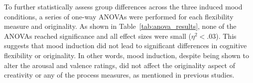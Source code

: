 \documentclass[../MA_Thesis.tex]{subfiles}
\begin{document}
To further statistically assess group differences across the three induced mood conditions, a series of one-way ANOVAs were performed for each flexibility measure and originality. As shown in Table~\ref{tab:anova_results}, none of the ANOVAs reached significance and all effect sizes were small ($\eta^2 < .03$). This suggests that mood induction did not lead to significant differences in cognitive flexibility or originality. In other words, mood induction, despite being shown to alter the arousal and valence ratings, did not affect the originality aspect of creativity or any of the process measures, as mentioned in previous studies. 

\end{document}
